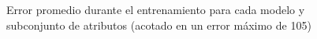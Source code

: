 \begin{figure}[h]
	\vspace{-4mm}
	\centering
	\captionsetup{aboveskip=-4pt, justification=centering}
	\caption{Error promedio durante el entrenamiento para cada modelo y subconjunto de atributos (acotado en un error máximo de 105)}
	\label{fig:ch5trainerror}
\end{figure}

